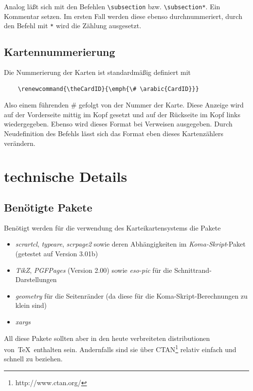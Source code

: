 \documentclass[a4paper,DIV=calc]{scrartcl}
\begin{document}
Analog läßt sich mit den Befehlen \lstinline!\subsection! bzw. \lstinline!\subsection*!. Ein Kommentar setzen. Im ersten Fall werden diese ebenso durchnummeriert, durch den Befehl mit \lstinline!*! wird die Zählung ausgesetzt.

\subsection{Kartennummerierung}
Die Nummerierung der Karten ist standardmäßig definiert mit 
\begin{lstlisting}
	\renewcommand{\theCardID}{\emph{\# \arabic{CardID}}}
\end{lstlisting}
Also einem führenden \# gefolgt von der Nummer der Karte. Diese Anzeige wird auf der Vorderseite mittig im Kopf gesetzt und auf der Rückseite im Kopf links wiedergegeben. Ebenso wird dieses Format bei Verweisen ausgegeben. Durch Neudefinition des Befehls lässt sich das Format eben dieses Kartenzählers verändern.
%
%
%
\section{technische Details}
\subsection{Benötigte Pakete}
Benötigt werden für die verwendung des Karteikartensystems die Pakete
\begin{itemize}
	\item \emph{scrartcl}, \emph{typeare}, \emph{scrpage2} sowie deren Abhängigkeiten im \emph{Koma-Skript}-Paket (getestet auf Version 3.01b)
	\item \emph{TikZ}, \emph{PGFPages} (Version 2.00) sowie \emph{eso-pic} für die Schnittrand-Darstellungen
	\item \emph{geometry} für die Seitenränder (da diese für die Koma-Skript-Berechnungen zu klein sind)
	\item \emph{xargs}
\end{itemize}
All diese Pakete sollten aber in den heute verbreiteten distributionen von\ \TeX\ enthalten sein. Andernfalls sind sie über CTAN\footnote{http://www.ctan.org/} relativ einfach und schnell zu beziehen.
\end{document}
